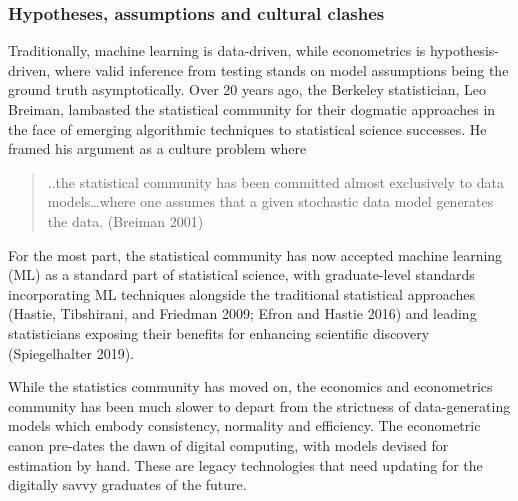 \documentclass{article}
\begin{document}
\hypertarget{hypotheses-assumptions-and-cultural-clashes}{%
\subsubsection{Hypotheses, assumptions and cultural
clashes}\label{hypotheses-assumptions-and-cultural-clashes}}

Traditionally, machine learning is data-driven, while econometrics is
hypothesis-driven, where valid inference from testing stands on model
assumptions being the ground truth asymptotically. Over 20 years ago,
the Berkeley statistician, Leo Breiman, lambasted the statistical
community for their dogmatic approaches in the face of emerging
algorithmic techniques to statistical science successes. He framed his
argument as a culture problem where

\begin{quote}
..the statistical community has been committed almost exclusively to
data models\ldots where one assumes that a given stochastic data model
generates the data. (Breiman 2001)
\end{quote}

For the most part, the statistical community has now accepted machine
learning (ML) as a standard part of statistical science, with
graduate-level standards incorporating ML techniques alongside the
traditional statistical approaches (Hastie, Tibshirani, and Friedman
2009; Efron and Hastie 2016) and leading statisticians exposing their
benefits for enhancing scientific discovery (Spiegelhalter 2019).

While the statistics community has moved on, the economics and
econometrics community has been much slower to depart from the
strictness of data-generating models which embody consistency, normality
and efficiency. The econometric canon pre-dates the dawn of digital
computing, with models devised for estimation by hand. These are legacy
technologies that need updating for the digitally savvy graduates of the
future.
\end{document}
